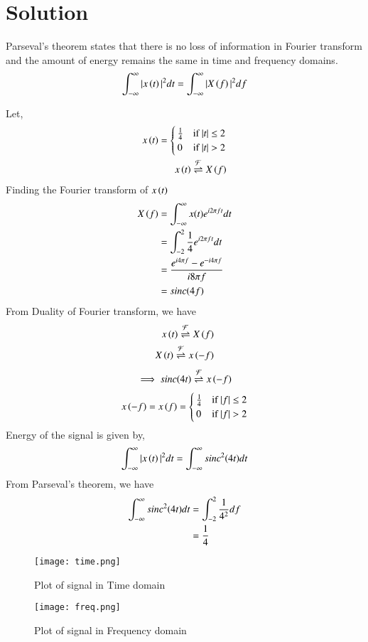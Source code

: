 \documentclass[journal,12pt,twocolumn]{IEEEtran}
\begin{document}
\section{Solution}
\begin{lemma}
Parseval's theorem states that there is no loss of information in Fourier transform and the amount of energy remains the same in time and frequency domains.
\begin{align}
    \int_{-\infty}^{\infty} |x\left(t\right)|^{2} dt = \int_{-\infty}^{\infty} |X\left(f\right)|^{2} df
\end{align}
\end{lemma}
Let,
\begin{align}
x\left(t\right) =
    \begin{cases}
    \frac{1}{4} & \text{if } |t| \leq 2\\
    0 & \text{if } |t| > 2
    \end{cases}\\
    x\left(t\right) \overset{\mathcal{F}}{ \rightleftharpoons}{X} \left(f\right)
\end{align}
Finding the Fourier transform of $x\left(t\right)$
\begin{align}
    X\left(f\right) &= \int_{-\infty}^{\infty} x(t)e^{i2\pi ft}dt\\
    &= \int_{-2}^{2}\frac{1}{4}e^{i2\pi ft}dt\\
    &= \frac{e^{i4\pi f} - e^{-i4\pi f}}{i8\pi f}\\
    &= sinc{\left(4f\right)}
\end{align}
From Duality of Fourier transform, we have
\begin{align}
    x\left(t\right) \overset{\mathcal{F}}{ \rightleftharpoons}{X} \left(f\right)\\
    X\left(t\right) \overset{\mathcal{F}}{ \rightleftharpoons}{x} \left(-f\right)
\end{align}
\begin{align}
    \implies sinc{\left(4t\right)} \overset{\mathcal{F}}{ \rightleftharpoons} x\left(-f\right) 
\end{align}
\begin{align}
    x\left(-f\right) = x\left(f\right) = 
    \begin{cases}
    \frac{1}{4} & \text{if } |f| \leq 2\\
    0 & \text{if } |f| > 2
    \end{cases}
\end{align}
Energy of the signal is given by,
\begin{align}
    \int_{-\infty}^{\infty} |x\left(t\right)|^{2} dt = \int_{-\infty}^{\infty} sinc^2{\left(4t\right)}  dt
\end{align}
From Parseval's theorem, we have
\begin{align}
    \int_{-\infty}^{\infty} sinc^2{\left(4t\right)}  dt &= \int_{-2}^{2} \frac{1}{4^{2}} df\\
    &= \frac{1}{4}
\end{align}
\begin{figure}[h!]
\centering
\texttt{[image: time.png]}
\caption{Plot of signal in Time domain}
\label{fig:sig_time}
\end{figure}
\begin{figure}[h!]
\centering
\texttt{[image: freq.png]}
\caption{Plot of signal in Frequency domain}
\label{fig:sig_freq}
\end{figure}
\end{document}
